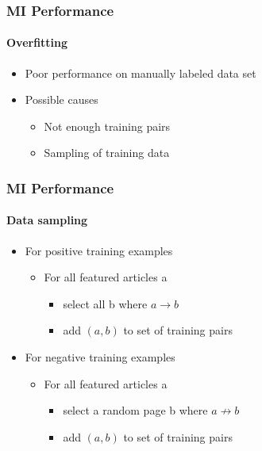 \begin{frame}
    \frametitle{MI Performance}
    \framesubtitle{Overfitting}
      \begin{itemize}
        \item Poor performance on manually labeled data set
        \item Possible causes 
        \begin{itemize}
          \item Not enough training pairs
          \item Sampling of training data
        \end{itemize}
      \end{itemize}
\end{frame}


\begin{frame}
    \frametitle{MI Performance}
    \framesubtitle{Data sampling}
    \begin{itemize}
      \item For positive training examples
      \begin{itemize}
        \item For all featured articles a
        \begin{itemize}
          \item select all b where $a \rightarrow b$
          \item add $(a,b)$ to set of training pairs
        \end{itemize}
      \end{itemize}
      \item For negative training examples
      \begin{itemize}
        \item For all featured articles a
        \begin{itemize}
          \item select a random page b where $a \not \rightarrow b$
          \item add $(a,b)$ to set of training pairs
        \end{itemize}
      \end{itemize}
    \end{itemize}
\end{frame}

